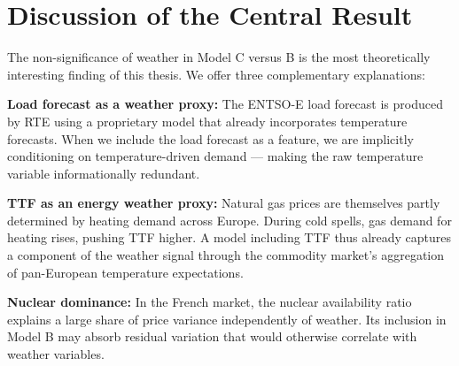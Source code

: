 \section{Discussion of the Central Result}

The non-significance of weather in Model C versus B is the most theoretically interesting finding of this thesis. We offer three complementary explanations:

\textbf{Load forecast as a weather proxy:} The ENTSO-E load forecast is produced by RTE using a proprietary model that already incorporates temperature forecasts. When we include the load forecast as a feature, we are implicitly conditioning on temperature-driven demand — making the raw temperature variable informationally redundant.

\textbf{TTF as an energy weather proxy:} Natural gas prices are themselves partly determined by heating demand across Europe. During cold spells, gas demand for heating rises, pushing TTF higher. A model including TTF thus already captures a component of the weather signal through the commodity market's aggregation of pan-European temperature expectations.

\textbf{Nuclear dominance:} In the French market, the nuclear availability ratio explains a large share of price variance independently of weather. Its inclusion in Model B may absorb residual variation that would otherwise correlate with weather variables.
